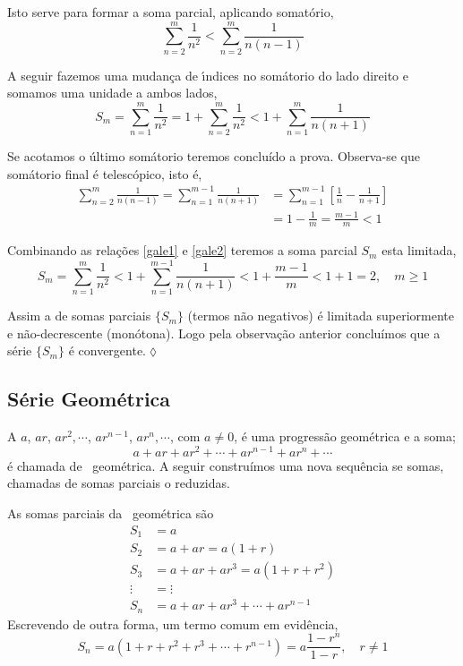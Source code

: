 Isto serve para formar a soma parcial, aplicando somat\'{o}rio,
\begin{equation*}
\sum_{n=2}^m\frac{1}{n^2}<\sum_{n=2}^m\frac{1}{n(n-1)}
\end{equation*}

A seguir fazemos uma mudan\c{c}a de \'{\i}ndices no som\'{a}torio do lado direito
e somamos uma unidade a ambos lados,
\begin{equation}\label{gale1}
S_m=\sum_{n=1}^m\frac{1}{n^2}=1+\sum_{n=2}^m\frac{1}{n^2}<1+\sum_{n=1}^m\frac{1}{n(n+1)}
\end{equation}

Se acotamos o \'{u}ltimo som\'{a}torio teremos concluído a prova. Observa-se
que som\'{a}torio final \'{e} telesc\'{o}pico, isto \'{e},
\begin{align}
\sum_{n=2}^m\frac{1}{n(n-1)}=\sum_{n=1}^{m-1}\frac{1}{n(n+1)}&=\sum_{n=1}^{m-1}
\left[\frac{1}{n}-\frac{1}{n+1}\right]\nonumber\\
&=1-\frac{1}{m}=\frac{m-1}{m}<1 \label{gale2}
\end{align}

Combinando as rela\c{c}\~{o}es \eqref{gale1} e \eqref{gale2} teremos a soma
parcial $S_m$ esta limitada,
\begin{equation*}
S_m=\sum_{n=1}^m\frac{1}{n^2}<1+\sum_{n=1}^{m-1}\frac{1}{n(n+1)}<1+\frac{m-1}{m}<1+1=2,\quad
m\ge 1
\end{equation*}

Assim a \seq de somas parciais $\{S_m\}$ (termos n\~{a}o negativos) \'{e}
limitada superiormente e n\~{a}o-decrescente (mon\'{o}tona). Logo pela
observa\c{c}\~{a}o anterior concluímos que a s\'{e}rie $\{ S_m\}$ \'{e}
convergente.\hfill \(\lozenge\)

\subsection{S\'{e}rie Geom\'{e}trica}
A \seq $a$, $ar$, $ar^2,\cdots$, $ar^{n-1}$, $ar^n,\cdots$, com
$a\neq 0$, \'{e} uma progress\~{a}o geom\'{e}trica e a soma;
\begin{equation*}
  a+ar+ar^2+\cdots+ar^{n-1}+ar^n+\cdots
\end{equation*}
\'{e} chamada de \ser\ geom\'{e}trica. A seguir construímos uma nova
sequ\^{e}ncia se somas, chamadas de somas parciais o reduzidas.

As somas parciais da \ser\ geom\'{e}trica s\~{a}o
\begin{align*}
S_1 &= a\\
S_2 &=a+ar=a(1+r)\\
S_3 &=a+ar+ar^3=a(1+r+r^2)\\
\vdots&=\vdots\\
S_n &=a+ar+ar^3+\cdots+ar^{n-1}
\end{align*}
Escrevendo de outra forma,  um termo comum em evid\^{e}ncia,
\begin{equation*}
  S_n=a(1+r+r^2+r^3+\cdots+r^{n-1})=a\frac{1-r^n}{1-r},\quad r\neq 1
\end{equation*}

